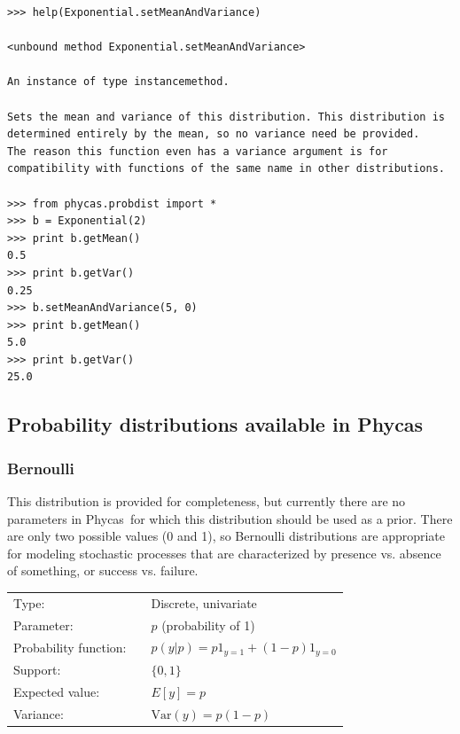\documentclass[10pt]{article}
\newcommand{\one}[1]{\mbox{$1_{#1}$}}
\newcommand{\Var}{\mbox{Var}}
\newcommand{\phycas}{{\sc Phycas}\index{Phycas}}
\begin{document}
\begin{verbatim}
>>> help(Exponential.setMeanAndVariance)

<unbound method Exponential.setMeanAndVariance>

An instance of type instancemethod.

Sets the mean and variance of this distribution. This distribution is
determined entirely by the mean, so no variance need be provided.
The reason this function even has a variance argument is for
compatibility with functions of the same name in other distributions.

>>> from phycas.probdist import *
>>> b = Exponential(2)
>>> print b.getMean()
0.5
>>> print b.getVar()
0.25
>>> b.setMeanAndVariance(5, 0)
>>> print b.getMean()
5.0
>>> print b.getVar()
25.0
\end{verbatim}

\subsection{Probability distributions available in \phycas}
\label{subsection:phycasprobdists}
\subsubsection{Bernoulli}
\renewcommand{\arraystretch}{1.5}

This distribution is provided for completeness, but currently there are no parameters in \phycas\ for which this distribution should be used as a prior. There are only two possible values (0 and 1), so Bernoulli distributions are appropriate for modeling stochastic processes that are characterized by presence vs. absence of something, or success vs. failure.

\begin{tabular}{lcl}
Type:                 & & Discrete, univariate \\
Parameter:            & & $p$ (probability of 1) \\
Probability function: & & $p(y|p) = p \one{y=1} + (1-p) \one{y=0}$ \\
Support:              & & $\{0,1\}$  \\
Expected value:       & & $E[y] = p$ \\
Variance:             & & $\Var(y) = p(1-p)$ 
\end{tabular}
\end{document}
